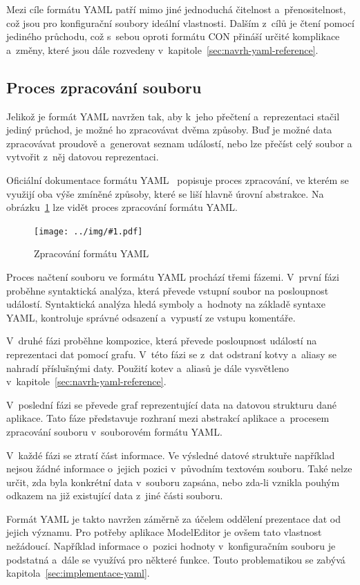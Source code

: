 \documentclass[FM,bw,DP]{tulthesis}
\newcommand{\includeimg}[2]{%
\begin{figure}[h]
	\centering
    \texttt{[image: ../img/\#1.pdf]}
    \caption{#2}
	\label{img:#1}
\end{figure}
}
\begin{document}
Mezi cíle formátu \gls{YAML} patří mimo jiné jednoduchá čitelnost a~přenositelnost, což jsou pro konfigurační soubory ideální vlastnosti. Dalším z~cílů je čtení pomocí jediného průchodu, což s~sebou oproti formátu \gls{CON} přináší určité komplikace a~změny, které jsou dále rozvedeny v~kapitole~\ref{sec:navrh-yaml-reference}.

\subsection{Proces zpracování souboru}

Jelikož je formát \gls{YAML} navržen tak, aby k~jeho přečtení a~reprezentaci stačil jediný průchod, je možné ho zpracovávat dvěma způsoby. Buď je možné data zpracovávat proudově a~generovat seznam událostí, nebo lze přečíst celý soubor a vytvořit z~něj datovou reprezentaci.

Oficiální dokumentace formátu \gls{YAML}~\cite{bib:yaml} popisuje proces zpracování, ve kterém se využijí oba výše zmíněné způsoby, které se liší hlavně úrovní abstrakce. Na obrázku~\ref{img:yaml} lze vidět proces zpracování formátu \gls{YAML}.

\includeimg{yaml}{Zpracování formátu \gls{YAML}}

Proces načtení souboru ve formátu \gls{YAML} prochází třemi fázemi. V~první fázi proběhne syntaktická analýza, která převede vstupní soubor na posloupnost událostí. Syntaktická analýza hledá symboly a~hodnoty na základě syntaxe \gls{YAML}, kontroluje správné odsazení a~vypustí ze vstupu komentáře.

V~druhé fázi proběhne kompozice, která převede posloupnost událostí na reprezentaci dat pomocí grafu. V~této fázi se z~dat odstraní kotvy a~aliasy se nahradí příslušnými daty. Použití kotev a~aliasů je dále vysvětleno v~kapitole~\ref{sec:navrh-yaml-reference}.

V~poslední fázi se převede graf reprezentující data na datovou strukturu dané aplikace. Tato fáze představuje rozhraní mezi abstrakcí aplikace a~procesem zpracování souboru v~souborovém formátu \gls{YAML}.

V~každé fázi se ztratí část informace. Ve výsledné datové struktuře například nejsou žádné informace o~jejich pozici v~původním textovém souboru. Také nelze určit, zda byla konkrétní data v~souboru zapsána, nebo zda-li vznikla pouhým odkazem na již existující data z~jiné části souboru.

Formát \gls{YAML} je takto navržen záměrně za účelem oddělení prezentace dat od jejich významu. Pro potřeby aplikace ModelEditor je ovšem tato vlastnost nežádoucí. Například informace o~pozici hodnoty v~konfiguračním souboru je podstatná a~dále se využívá pro některé funkce. Touto problematikou se zabývá kapitola~\ref{sec:implementace-yaml}.
\end{document}
